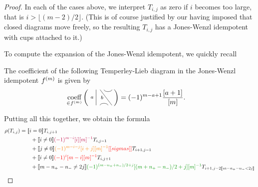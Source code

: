 \documentclass[12pt]{article}
\begin{document}
\begin{proof}
In each of the cases above, we interpret $T_{i,j}$ as zero if $i$ becomes too large, that is $i > \lfloor (m-2)/2 \rfloor$. (This is of course justified by our having imposed that closed diagrams move freely, so the resulting $T_{i,j}$ has a Jones-Wenzl idempotent with cups attached to it.)

To compute the expansion of the Jones-Wenzl idempotent, we quickly recall
\begin{lem}
The coefficient of the following Temperley-Lieb diagram in the Jones-Wenzl idempotent $f^{(m)}$ is given by
\begin{align*}
\underset{\in \jw{m}}{\textrm{coeff}}
\left(
\begin{tikzpicture}[baseline = -.1cm, yscale=-.5]
	\draw (-.5,-.8)--(-.5,.8);
	\draw (-.3,.8) arc (-180:0:.2cm);
	\draw (-.3,-.8)--(.3,.8);
	\draw (-.1,-.8) arc (180:0:.2cm);
	\node at (-.7,0) {{\scriptsize{$a$}}};
	\node at (-.2,0) {{\scriptsize{$b$}}};
    \node at (.2,0) {$\phantom{c}$};
\end{tikzpicture}
\right)
& =
(-1)^{m-a+1}\frac{[a+1]}{[m]}.
\end{align*}
\end{lem}


Putting all this together, we obtain the formula
\begin{align*}
\rho(T_{i,j}) & =
\truth{i = 0} T_{i, j + 1} \\
& \qquad +
\truth{i \neq 0} \textcolor{purple}{(-1)^{m-i} [i][m]^{-1}} T_{i,j-1} \\
& \qquad +
\truth{j \neq 0}\textcolor{orange}{(-1)^{m-i-j} [i+j][m]^{-1}} \nn{sigmas} T_{i+1, j-1} \\
& \qquad +
\truth{i \neq 0}\textcolor{red}{(-1)^{i}  [m-i][m]^{-1}} T_{i, j + 1} \\
& \qquad +
\truth{m-n_+-n_-\neq 2j} \textcolor{DarkGreen}{(-1)^{(m - n_+ + n_-)/2 + j} [(m + n_+ - n_-)/2 + j][m]^{-1}} T_{i+1,j-2\truth{m-n_+-n_- < 2j}}
\end{align*}


\end{proof}
\end{document}
